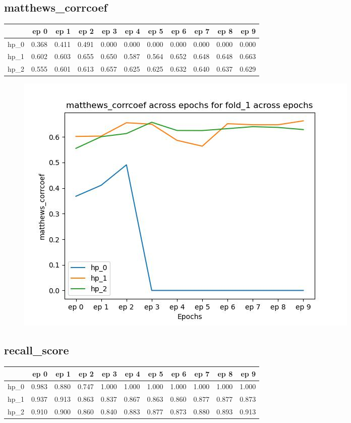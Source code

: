 \documentclass{article}
\begin{document}
\subsection{matthews\_corrcoef}
\begin{tabular}{lrrrrrrrrrr}
\toprule
{} &   ep 0 &   ep 1 &   ep 2 &   ep 3 &   ep 4 &   ep 5 &   ep 6 &   ep 7 &   ep 8 &   ep 9 \\
\midrule
hp\_0 &  0.368 &  0.411 &  0.491 &  0.000 &  0.000 &  0.000 &  0.000 &  0.000 &  0.000 &  0.000 \\
hp\_1 &  0.602 &  0.603 &  0.655 &  0.650 &  0.587 &  0.564 &  0.652 &  0.648 &  0.648 &  0.663 \\
hp\_2 &  0.555 &  0.601 &  0.613 &  0.657 &  0.625 &  0.625 &  0.632 &  0.640 &  0.637 &  0.629 \\
\bottomrule
\end{tabular}

\begin{figure}[H]
\includegraphics[scale = 0.75]{fold_1/matthews_corrcoef}
\end{figure}
\subsection{recall\_score}
\begin{tabular}{lrrrrrrrrrr}
\toprule
{} &   ep 0 &   ep 1 &   ep 2 &   ep 3 &   ep 4 &   ep 5 &   ep 6 &   ep 7 &   ep 8 &   ep 9 \\
\midrule
hp\_0 &  0.983 &  0.880 &  0.747 &  1.000 &  1.000 &  1.000 &  1.000 &  1.000 &  1.000 &  1.000 \\
hp\_1 &  0.937 &  0.913 &  0.863 &  0.837 &  0.867 &  0.863 &  0.860 &  0.877 &  0.877 &  0.873 \\
hp\_2 &  0.910 &  0.900 &  0.860 &  0.840 &  0.883 &  0.877 &  0.873 &  0.880 &  0.893 &  0.913 \\
\bottomrule
\end{tabular}
\end{document}
